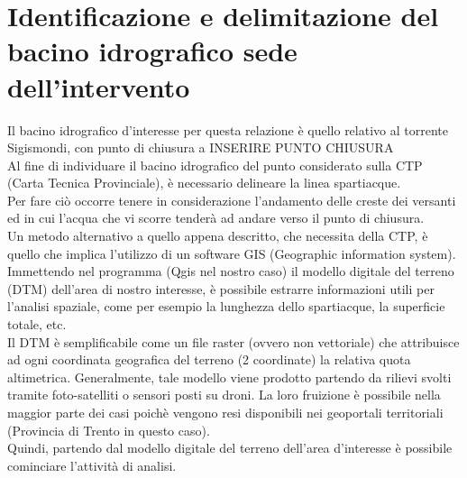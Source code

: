 \section{Identificazione e delimitazione del bacino idrografico sede dell'intervento}
Il bacino idrografico d'interesse per questa relazione è quello relativo al torrente Sigismondi, con punto di chiusura a INSERIRE PUNTO CHIUSURA\\
Al fine di individuare il bacino idrografico del punto considerato sulla CTP (Carta Tecnica Provinciale), è necessario delineare la linea spartiacque.\\
Per fare ciò occorre tenere in considerazione l'andamento delle creste dei versanti ed in cui l'acqua che vi scorre tenderà ad andare verso il punto di chiusura.\\
Un metodo alternativo a quello appena descritto, che necessita della CTP, è quello che implica l'utilizzo di un software GIS (Geographic information system).\\
Immettendo nel programma (Qgis nel nostro caso) il modello digitale del terreno (DTM) dell'area di nostro interesse, è possibile estrarre informazioni utili per l'analisi spaziale, come per esempio la lunghezza dello spartiacque, la superficie totale, etc.\\
Il DTM è semplificabile come un file raster (ovvero non vettoriale) che attribuisce ad ogni coordinata geografica del terreno (2 coordinate) la relativa quota altimetrica. Generalmente, tale modello viene prodotto partendo da rilievi svolti tramite foto-satelliti o sensori posti su droni. La loro fruizione è possibile nella maggior parte dei casi poichè vengono resi disponibili nei geoportali territoriali (Provincia di Trento in questo caso).\\
Quindi, partendo dal modello digitale del terreno dell'area d'interesse è possibile cominciare l'attività di analisi.\\
